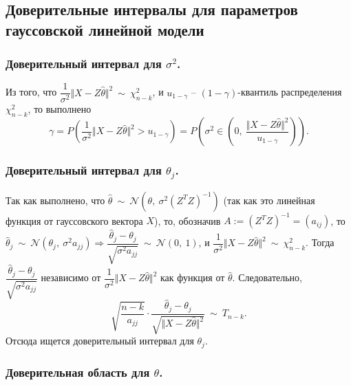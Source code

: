 \subsection*{Доверительные интервалы для параметров гауссовской линейной модели}
\subsubsection*{Доверительный интервал для $\sigma^{2}$.}

Из того, что $\displaystyle \dfrac{1}{\sigma ^{2}}\Vert X-Z\hat{\theta }\Vert ^{2} \ \sim \ \chi _{n-k}^{2}$, и $\displaystyle u_{1-\gamma }$ -- $\displaystyle ( 1-\gamma )$-квантиль распределения $\displaystyle \chi _{n-k}^{2}$, то выполнено
\begin{equation*}
    \gamma =P\left(\dfrac{1}{\sigma ^{2}}\Vert X-Z\hat{\theta }\Vert ^{2}  >u_{1-\gamma }\right) =P\left( \sigma ^{2} \in \left( 0,\ \dfrac{\Vert X-Z\hat{\theta }\Vert ^{2}}{u_{1-\gamma }}\right)\right) .
\end{equation*}
\subsubsection*{Доверительный интервал для $\theta_{j}$.}

Так как выполнено, что $\displaystyle \hat{\theta } \ \sim \ \mathcal{N}\left( \theta ,\ \sigma ^{2}\left( Z^{T} Z\right)^{-1}\right)$ (так как это линейная функция от гауссовского вектора $X$), то, обозначив $\displaystyle A:=\left( Z^{T} Z\right)^{-1} =( a_{ij})$, то $\displaystyle \hat{\theta }_{j} \ \sim \ \mathcal{N}\left( \theta _{j} ,\ \sigma ^{2} a_{jj}\right) \Rightarrow \dfrac{\hat{\theta }_{j} -\theta _{j}}{\sqrt{\sigma ^{2} a_{jj}}} \ \sim \ \mathcal{N}( 0,\ 1)$, и $\displaystyle \dfrac{1}{\sigma ^{2}}\Vert X-Z\hat{\theta }\Vert ^{2} \ \sim \ \chi _{n-k}^{2}$. Тогда $\displaystyle \dfrac{\hat{\theta }_{j} -\theta _{j}}{\sqrt{\sigma ^{2} a_{jj}}}$ независимо от $\displaystyle \dfrac{1}{\sigma ^{2}}\Vert X-Z\hat{\theta }\Vert ^{2}$ как функция от $\displaystyle \hat{\theta }$. Следовательно,
\begin{equation*}
    \sqrt{\dfrac{n-k}{a_{jj}}} \cdotp \dfrac{\hat{\theta }_{j} -\theta _{j}}{\sqrt{\Vert X-Z\hat{\theta }\Vert ^{2}}} \ \sim \ T_{n-k} .
\end{equation*}
Отсюда ищется доверительный интервал для $\displaystyle \theta _{j}$.


\subsubsection*{Доверительная область для $\theta$.}

